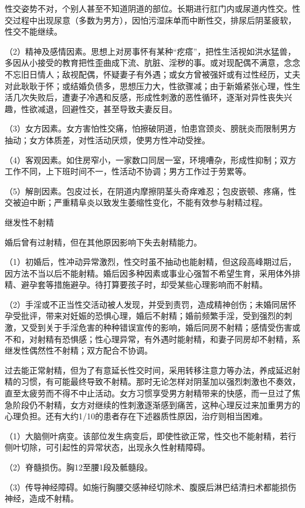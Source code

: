 \begin{enumerate}
性交姿势不对，个别人甚至不知道阴道的部位。长期进行肛门内或尿道内性交。性交过程中出现尿意（多数为男方），因怕污湿床单而中断性交，排尿后阴茎疲软，性交不能继续。

（2）精神及感情因素。思想上对房事怀有某种“疙瘩”，把性生活视如洪水猛兽，多因从小接受的教育把性歪曲成下流、肮脏、淫秽的事。或对现配偶不满意，念念不忘旧日情人；敌视配偶，怀疑妻子有外遇；或女方曾被强奸或有过性经历，丈夫对此耿耿于怀；或结婚负债多，思想压力大，性欲骤减；由于新婚紧张心理，性生活几次失败后，遭妻子冷遇和反感，形成性刺激的恶性循环，逐渐对异性丧失兴趣，性欲减退，回避性交，甚至导致夫妻反目。

（3）女方因素。女方害怕性交痛，怕擦破阴道，怕患宫颈炎、膀胱炎而限制男方抽动；女方体质差，对性活动厌烦，使男方性冲动受挫。

（4）客观因素。如住房窄小，一家数口同居一室，环境嘈杂，形成性抑制；双方工作不同，上下班时间不一，性活动不协调；男方工作过于劳累等。

（5）解剖因素。包皮过长，在阴道内摩擦阴茎头奇痒难忍；包皮嵌顿、疼痛，性交被迫中断；严重精阜炎以致发生萎缩性变化，不能有效参与射精过程。

继发性不射精

婚后曾有过射精，但在其他原因影响下失去射精能力。

（1）初婚后，性冲动异常激烈，性交时虽不抽动也能射精，但这段高峰期过后，因方法不当以后不能射精。婚后因多种因素或事业心强暂不希望生育，采用体外排精、避孕套等措施避孕。待打算要孩子时，却受某些心理影响而不射精。

（2）手淫或不正当性交活动被人发现，并受到责罚，造成精神创伤；未婚同居怀孕受批评，带来对妊娠的恐惧心理，婚后不射精；婚前频繁手淫，受到强烈的刺激，又受到关于手淫危害的种种错误宣传的影响，婚后同房不射精；感情受伤害或不和，对射精有恐惧感；性心理异常，有外遇时能射精，和妻子同房却不射精，系继发性偶然性不射精；双方配合不协调。

过去能正常射精，但为了有意延长性交时间，采用转移注意力等办法，养成延迟射精的习惯，有可能最终导致不射精。那时无论怎样对阴茎加以强烈刺激也不奏效，直至太疲劳而不得不中止活动。女方习惯享受男方射精带来的快感，而一旦过了焦急阶段仍不射精，女方对继续的性刺激逐渐感到痛苦，这种心理反过来加重男方的心理负担。还有大约1/10的患者存在下述器质性原因，治疗则相当困难。

（1）大脑侧叶病变。该部位发生病变后，即使性欲正常，性交也不能射精，若行侧叶切除，可引起性的异常状态，出现永久性射精障碍。

（2）脊髓损伤。胸12至腰1段及骶髓段。

（3）传导神经障碍。如施行胸腰交感神经切除术、腹膜后淋巴结清扫术都能损伤神经，造成不射精。


\end{enumerate}
